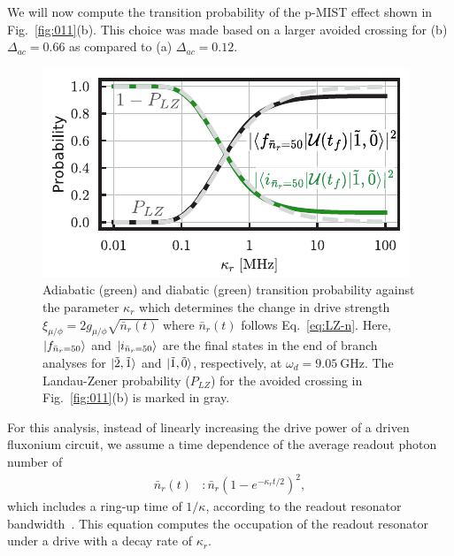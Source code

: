 \documentclass[%
reprint,
superscriptaddress,
 amsmath,amssymb,
 aps,
 prx,
longbibliography,
floatfix,
]{revtex4-2}
\begin{document}
We will now compute the transition probability of the p-MIST effect shown in Fig.~\ref{fig:011}(b). This choice was made based on a larger avoided crossing for (b) $\Delta_{ac}=0.66$ as compared to (a)  $\Delta_{ac}=0.12$.
\begin{figure}[htb]
    \centering
    \includegraphics[width=\linewidth]{Figures/LZ.pdf}
    \caption{Adiabatic (green) and diabatic (green) transition probability against the parameter $\kappa_r$ which determines the change in drive strength $\xi_{\mu/\phi}=2g_{\mu/\phi}\sqrt{\bar n_r(t)}$ where $\bar n_r(t)$ follows Eq.~\ref{eq:LZ-n}. Here, $\ket{f_{\bar n_r=50}}$ and $\ket{i_{\bar n_r=50}}$ are the final states in the end of branch analyses for $\ket{\tilde{2},\tilde{1}}$ and $\ket{\tilde{1},\tilde{0}}$, respectively, at $\omega_d=9.05 \ \mathrm{GHz}$. The Landau-Zener probability ($P_{LZ}$) for the avoided crossing in Fig.~\ref{fig:011}(b) is marked in gray.}
    \label{fig:LZ}
\end{figure}
For this analysis, instead of linearly increasing the drive power of a driven fluxonium circuit, we assume a time dependence of the average readout photon number of
\begin{align}
    \bar n_r(t)&:\bar n_r(1-e^{-\kappa_r t/2})^2,\label{eq:LZ-n}
\end{align}
which includes a ring-up time of $1/\kappa$, according to the readout resonator bandwidth~\cite{khezri2023measurement,dumas2024unified,cohen2023reminiscence}. This equation computes the occupation of the readout resonator under a drive with a decay rate of $\kappa_r$. %
\end{document}
